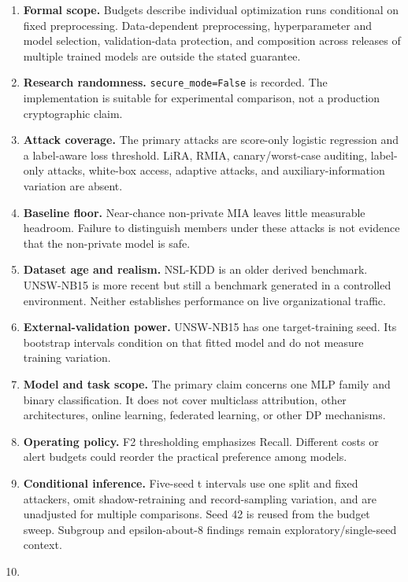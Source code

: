 \documentclass[11pt,a4paper]{article}
\providecommand{\tightlist}{\setlength{\itemsep}{0pt}\setlength{\parskip}{0pt}}
\begin{document}
\begin{enumerate}
\def\labelenumi{\arabic{enumi}.}
\tightlist
\item
  \textbf{Formal scope.} Budgets describe individual optimization runs
  conditional on fixed preprocessing. Data-dependent preprocessing,
  hyperparameter and model selection, validation-data protection, and
  composition across releases of multiple trained models are outside the
  stated guarantee.
\item
  \textbf{Research randomness.} \texttt{secure\_mode=False} is recorded.
  The implementation is suitable for experimental comparison, not a
  production cryptographic claim.
\item
  \textbf{Attack coverage.} The primary attacks are score-only logistic
  regression and a label-aware loss threshold. LiRA, RMIA,
  canary/worst-case auditing, label-only attacks, white-box access,
  adaptive attacks, and auxiliary-information variation are absent.
\item
  \textbf{Baseline floor.} Near-chance non-private MIA leaves little
  measurable headroom. Failure to distinguish members under these
  attacks is not evidence that the non-private model is safe.
\item
  \textbf{Dataset age and realism.} NSL-KDD is an older derived
  benchmark. UNSW-NB15 is more recent but still a benchmark generated in
  a controlled environment. Neither establishes performance on live
  organizational traffic.
\item
  \textbf{External-validation power.} UNSW-NB15 has one target-training
  seed. Its bootstrap intervals condition on that fitted model and do
  not measure training variation.
\item
  \textbf{Model and task scope.} The primary claim concerns one MLP
  family and binary classification. It does not cover multiclass
  attribution, other architectures, online learning, federated learning,
  or other DP mechanisms.
\item
  \textbf{Operating policy.} F2 thresholding emphasizes Recall.
  Different costs or alert budgets could reorder the practical
  preference among models.
\item
  \textbf{Conditional inference.} Five-seed t intervals use one split
  and fixed attackers, omit shadow-retraining and record-sampling
  variation, and are unadjusted for multiple comparisons. Seed 42 is
  reused from the budget sweep. Subgroup and epsilon-about-8 findings
  remain exploratory/single-seed context.
\item

\end{enumerate}
\end{document}
